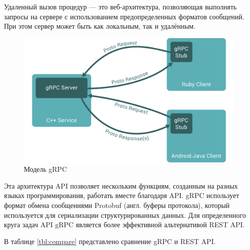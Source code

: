 
Удаленный вызов процедур --- это веб-архитектура, позволяющая выполнять запросы на сервере с использованием предопределенных форматов сообщений. При этом сервер может быть как локальным, так и удалённым.

\begin{figure}[h]
	\centering
	\includegraphics[width=\textwidth ]{img/gRPC.png}
	\caption{Модель gRPC}
	\label{fig:gRPC}
\end{figure} 

Эта архитектура API позволяет нескольким функциям, созданным на разных языках программирования, работать вместе благодаря API. gRPC использует формат обмена сообщениями Protobuf (англ. буферы протокола), который используется для сериализации структурированных данных. Для определенного круга задач API gRPC является более эффективной альтернативой REST API.




В таблице \ref{tbl:compare} представлено сравнение gRPC и REST API.

